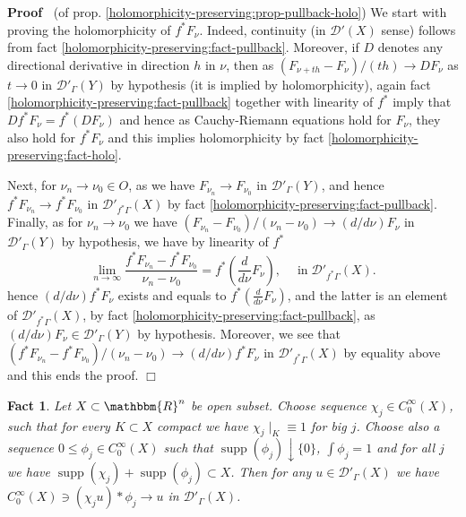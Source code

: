 \documentclass{article}
\newcommand{\nosymbol}{}
\newcommand{\nocomma}{}
\newcommand{\tmop}[1]{\ensuremath{\operatorname{#1}}}
\renewenvironment{proof}{\noindent\textbf{Proof\ }}{\hspace*{\fill}$\Box$\medskip}
\newtheorem{fact}[proposition]{Fact}
\theoremstyle{remark}
\begin{document}
\begin{proof}
  (of prop. \ref{holomorphicity-preserving:prop-pullback-holo}) We start with
  proving the holomorphicity of $f^{\ast} F_{\nu} \nosymbol$. Indeed,
  continuity (in $\mathcal{D}' (X)$ sense) follows from fact
  \ref{holomorphicity-preserving:fact-pullback}. Moreover, if $D$ denotes any
  directional derivative in direction $h$ in $\nu$, then as $(F_{\nu + t h} -
  F_{\nu}) / (t h) \rightarrow D F_{\nu}$ as $t \rightarrow 0$ in
  $\mathcal{D}'_{\Gamma} (Y)$ by hypothesis (it is implied by holomorphicity),
  again fact \ref{holomorphicity-preserving:fact-pullback} together with
  linearity of $f^{\ast}$ imply that $D f^{\ast} F_{\nu} = f^{\ast} (D
  F_{\nu})$ and hence as Cauchy-Riemann equations hold for $F_{\nu}$, they
  also hold for $f^{\ast} F_{\nu}$ and this implies holomorphicity by fact
  \ref{holomorphicity-preserving:fact-holo}.
  
  Next, for $\nu_n \rightarrow \nu_0 \in O$, as we have $F_{\nu_n} \rightarrow
  F_{\nu_0}$ in $\mathcal{D}'_{\Gamma} (Y)$, and hence $f^{\ast} F_{\nu_n}
  \rightarrow f^{\ast} F_{\nu_0}$ in $\mathcal{D}'_{f^{\ast} \Gamma} (X)$ by
  fact \ref{holomorphicity-preserving:fact-pullback}. Finally, as for $\nu_n
  \rightarrow \nu_0$ we have $(F_{\nu_n} - F_{\nu_0}) / (\nu_n - \nu_0)
  \rightarrow (d / d \nu) F_{\nu}$ in $\mathcal{D}'_{\Gamma} (Y)$ by
  hypothesis, we have by linearity of $f^{\ast}$
  \[ \lim_{n \rightarrow \infty} \frac{f^{\ast} F_{\nu_n} - f^{\ast}
     F_{\nu_0}}{\nu_n - \nu_0} = f^{\ast} \left( \frac{d}{d \nu} F_{\nu}
     \right) \nocomma, \quad \tmop{in} \mathcal{D}'_{f^{\ast} \Gamma} (X) . \]
  hence $(d / d \nu) f^{\ast} F_{\nu}$ exists and equals to $f^{\ast} \left(
  \frac{d}{d \nu} F_{\nu} \right)$, and the latter is an element of
  $\mathcal{D}'_{f^{\ast} \Gamma} (X)$, by fact
  \ref{holomorphicity-preserving:fact-pullback}, as $(d / d \nu) F_{\nu} \in
  \mathcal{D}'_{\Gamma} (Y)$ by hypothesis. Moreover, we see that $(f^{\ast}
  F_{\nu_n} - f^{\ast} F_{\nu_0}) / (\nu_n - \nu_0) \rightarrow (d / d \nu)
  f^{\ast} F_{\nu}$ in $\mathcal{D}'_{f^{\ast} \Gamma} (X)$ by equality above
  and this ends the proof.
\end{proof}

\begin{fact}
\label{holomorphicity-preserving:fact-p3}{\cite[thm.
8.2.3]{hormander1983analysis}} Let $X \subset \mathbbm{R}^n$ be open subset.
Choose sequence $\chi_j \in C^{\infty}_0 (X)$, such that for every $K \subset
X$ compact we have $\chi_j \mid_K \equiv 1$ for big $j$. Choose also a
sequence $0 \leqslant \phi_j \in C_0^{\infty} (X)$ such that $\tmop{supp}
(\phi_j) \downarrow \{ 0 \}$, $\int \phi_j = 1$ and for all $j$ we have
$\tmop{supp} (\chi_j) + \tmop{supp} (\phi_j) \subset X$. Then for any $u
\in \mathcal{D}'_{\Gamma} (X)$ we have $C^{\infty}_0 (X) \ni (\chi_j u) \ast
\phi_j \rightarrow u$ in $\mathcal{D}'_{\Gamma}
(X)$.
\end{fact}
\end{document}
